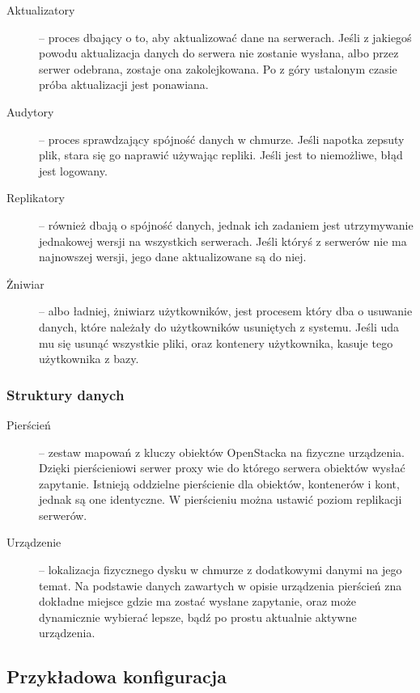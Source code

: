 \begin{description}
\item[Aktualizatory] -- proces dbający o to, aby aktualizować dane na serwerach. Jeśli z jakiegoś powodu aktualizacja danych do serwera nie zostanie wysłana, albo przez serwer odebrana, zostaje ona zakolejkowana. Po z góry ustalonym czasie próba aktualizacji jest ponawiana.
\item[Audytory] -- proces sprawdzający spójność danych w chmurze. Jeśli napotka zepsuty plik, stara się go naprawić używając repliki. Jeśli jest to niemożliwe, błąd jest logowany. 
\item[Replikatory] -- również dbają o spójność danych, jednak ich zadaniem jest utrzymywanie jednakowej wersji na wszystkich serwerach. Jeśli któryś z serwerów nie ma najnowszej wersji, jego dane aktualizowane są do niej.
\item[Żniwiar] -- albo ładniej, żniwiarz użytkowników, jest procesem który dba o usuwanie danych, które należały do użytkowników usuniętych z systemu. Jeśli uda mu się usunąć wszystkie pliki, oraz kontenery użytkownika, kasuje tego użytkownika z bazy.
\end{description}

\subsubsection{Struktury danych}\label{sub:struktury danych}

\begin{description}
\item[Pierścień] -- zestaw mapowań z kluczy obiektów OpenStacka na fizyczne urządzenia. Dzięki pierścieniowi serwer proxy wie do którego serwera obiektów wysłać zapytanie. Istnieją oddzielne pierścienie dla obiektów, kontenerów i kont, jednak są one identyczne. W pierścieniu można ustawić poziom replikacji serwerów.
\item[Urządzenie] -- lokalizacja fizycznego dysku w chmurze z dodatkowymi danymi na jego temat. Na podstawie danych zawartych w opisie urządzenia pierścień zna dokładne miejsce gdzie ma zostać wysłane zapytanie, oraz może dynamicznie wybierać lepsze, bądź po prostu aktualnie aktywne urządzenia.
\end{description}

\subsection{Przykładowa konfiguracja}\label{sub:przykladowa konfiguracja}

